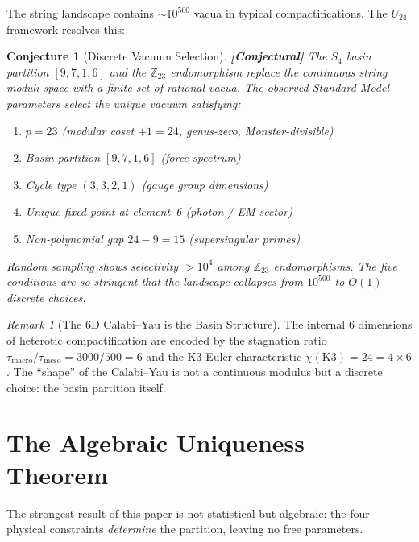 \documentclass[12pt,a4paper]{article}
\newcommand{\conjectural}[1]{\textcolor{conjectural}{\textbf{[Conjectural]}} #1}
\newtheorem{conjecture}[theorem]{Conjecture}
\theoremstyle{definition}\newtheorem{definition}[theorem]{Definition}
\theoremstyle{remark}\newtheorem{remark}[theorem]{Remark}
\newcommand{\Zp}{\mathbb{Z}_{23}}
\begin{document}
The string landscape contains $\sim 10^{500}$ vacua in typical
compactifications. The $U_{24}$ framework resolves this:

\begin{conjecture}[Discrete Vacuum Selection]
\label{conj:landscape}
\conjectural{The $S_4$ basin partition $[9,7,1,6]$ and the $\Zp$ endomorphism
replace the continuous string moduli space with a finite set of rational vacua.
The observed Standard Model parameters select the unique vacuum satisfying:}
\begin{enumerate}
  \item $p = 23$ (modular coset $+ 1 = 24$, genus-zero, Monster-divisible)
  \item Basin partition $[9, 7, 1, 6]$ (force spectrum)
  \item Cycle type $(3, 3, 2, 1)$ (gauge group dimensions)
  \item Unique fixed point at element~6 (photon / EM sector)
  \item Non-polynomial gap $24 - 9 = 15$ (supersingular primes)
\end{enumerate}
Random sampling \cite{paper3} shows selectivity $> 10^4$ among $\Zp$
endomorphisms. The five conditions are so stringent that the landscape collapses
from $10^{500}$ to $O(1)$ discrete choices.
\end{conjecture}

\begin{remark}[The 6D Calabi--Yau is the Basin Structure]
The internal 6 dimensions of heterotic compactification are encoded by the
stagnation ratio $\tau_{\mathrm{macro}}/\tau_{\mathrm{meso}} = 3000/500 = 6$
and the K3 Euler characteristic $\chi(\mathrm{K3}) = 24 = 4 \times 6$. The
``shape'' of the Calabi--Yau is not a continuous modulus but a discrete choice:
the basin partition itself.
\end{remark}

\section{The Algebraic Uniqueness Theorem}
\label{sec:uniqueness}

The strongest result of this paper is not statistical but algebraic: the four
physical constraints \emph{determine} the partition, leaving no free parameters.
\end{document}
